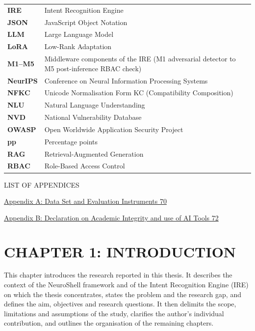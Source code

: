 \documentclass[
]{article}
\begin{document}
\begin{longtable}[]{@{}
  >{\raggedright\arraybackslash}p{}
  >{\raggedright\arraybackslash}p{}@{}}
\textbf{IRE} & Intent Recognition Engine \\
\textbf{JSON} & JavaScript Object Notation \\
\textbf{LLM} & Large Language Model \\
\textbf{LoRA} & Low-Rank Adaptation \\
\textbf{M1--M5} & Middleware components of the IRE (M1 adversarial
detector to M5 post-inference RBAC check) \\
\textbf{NeurIPS} & Conference on Neural Information Processing
Systems \\
\textbf{NFKC} & Unicode Normalisation Form KC (Compatibility
Composition) \\
\textbf{NLU} & Natural Language Understanding \\
\textbf{NVD} & National Vulnerability Database \\
\textbf{OWASP} & Open Worldwide Application Security Project \\
\textbf{pp} & Percentage points \\
\textbf{RAG} & Retrieval-Augmented Generation \\
\textbf{RBAC} & Role-Based Access Control \\
\bottomrule()
\end{longtable}

\protect\hypertarget{_Toc900006}{}{}LIST OF APPENDICES

\protect\hyperlink{appendix-a-data-set-and-evaluation-instruments}{Appendix
A: Data Set and Evaluation Instruments 70}

\protect\hyperlink{appendix-b-declaration-on-academic-integrity-and-use-of-ai-tools}{Appendix
B: Declaration on Academic Integrity and use of AI Tools 72}

\hypertarget{chapter-1-introduction}{%
\section{CHAPTER 1: INTRODUCTION}\label{chapter-1-introduction}}

This chapter introduces the research reported in this thesis. It
describes the context of the NeuroShell framework and of the Intent
Recognition Engine (IRE) on which the thesis concentrates, states the
problem and the research gap, and defines the aim, objectives and
research questions. It then delimits the scope, limitations and
assumptions of the study, clarifies the author's individual
contribution, and outlines the organisation of the remaining chapters.
\end{document}
